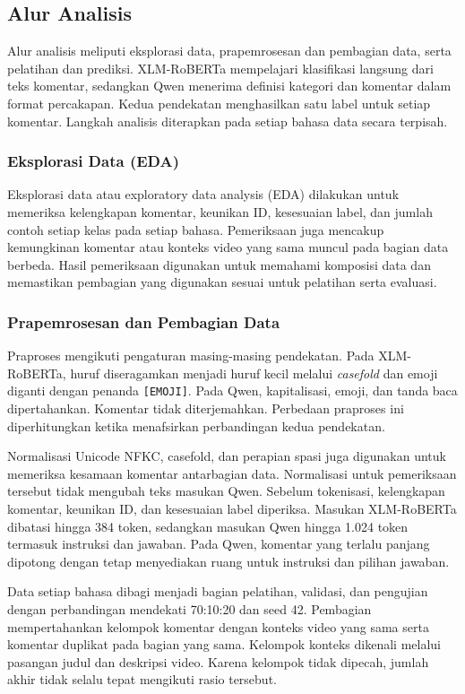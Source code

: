 \documentclass[11pt]{article}
\begin{document}
\subsection{Alur Analisis}
Alur analisis meliputi eksplorasi data, prapemrosesan dan pembagian data, serta pelatihan dan prediksi. XLM-RoBERTa mempelajari klasifikasi langsung dari teks komentar, sedangkan Qwen menerima definisi kategori dan komentar dalam format percakapan. Kedua pendekatan menghasilkan satu label untuk setiap komentar. Langkah analisis diterapkan pada setiap bahasa data secara terpisah.

\subsubsection{Eksplorasi Data (EDA)}
Eksplorasi data atau exploratory data analysis (EDA) dilakukan untuk memeriksa kelengkapan komentar, keunikan ID, kesesuaian label, dan jumlah contoh setiap kelas pada setiap bahasa. Pemeriksaan juga mencakup kemungkinan komentar atau konteks video yang sama muncul pada bagian data berbeda. Hasil pemeriksaan digunakan untuk memahami komposisi data dan memastikan pembagian yang digunakan sesuai untuk pelatihan serta evaluasi.

\subsubsection{Prapemrosesan dan Pembagian Data}
Praproses mengikuti pengaturan masing-masing pendekatan. Pada XLM-RoBERTa, huruf diseragamkan menjadi huruf kecil melalui \textit{casefold} dan emoji diganti dengan penanda \texttt{[EMOJI]}. Pada Qwen, kapitalisasi, emoji, dan tanda baca dipertahankan. Komentar tidak diterjemahkan. Perbedaan praproses ini diperhitungkan ketika menafsirkan perbandingan kedua pendekatan.

Normalisasi Unicode NFKC, casefold, dan perapian spasi juga digunakan untuk memeriksa kesamaan komentar antarbagian data. Normalisasi untuk pemeriksaan tersebut tidak mengubah teks masukan Qwen. Sebelum tokenisasi, kelengkapan komentar, keunikan ID, dan kesesuaian label diperiksa. Masukan XLM-RoBERTa dibatasi hingga 384 token, sedangkan masukan Qwen hingga 1.024 token termasuk instruksi dan jawaban. Pada Qwen, komentar yang terlalu panjang dipotong dengan tetap menyediakan ruang untuk instruksi dan pilihan jawaban.

Data setiap bahasa dibagi menjadi bagian pelatihan, validasi, dan pengujian dengan perbandingan mendekati 70:10:20 dan seed 42. Pembagian mempertahankan kelompok komentar dengan konteks video yang sama serta komentar duplikat pada bagian yang sama. Kelompok konteks dikenali melalui pasangan judul dan deskripsi video. Karena kelompok tidak dipecah, jumlah akhir tidak selalu tepat mengikuti rasio tersebut.
\end{document}
